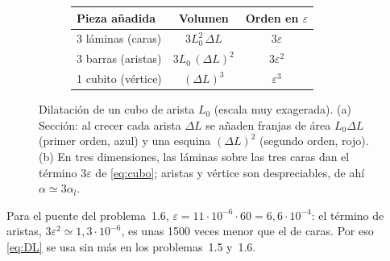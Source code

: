 \begin{figure}[htbp]
\centering
\begin{subfigure}[c]{0.4\textwidth}\centering
{}
\caption{}
\end{subfigure}\hfill
\begin{subfigure}[c]{0.52\textwidth}\centering
\small
\begin{tabular}{lcc}
\toprule
Pieza añadida & Volumen & Orden en $\varepsilon$\\
\midrule
3 láminas (caras) & $3L_0^2\,\Delta L$ & $3\varepsilon$\\
3 barras (aristas) & $3L_0\,(\Delta L)^2$ & $3\varepsilon^2$\\
1 cubito (vértice) & $(\Delta L)^3$ & $\varepsilon^3$\\
\bottomrule
\end{tabular}
\vspace{1.2cm}
\caption{}
\end{subfigure}
\caption{Dilatación de un cubo de arista $L_0$ (escala muy exagerada). (a) Sección: al crecer cada arista
$\Delta L$ se añaden franjas de área $L_0\Delta L$ (primer orden, azul) y una esquina $(\Delta L)^2$
(segundo orden, rojo). (b) En tres dimensiones, las láminas sobre las tres caras dan el término
$3\varepsilon$ de \eqref{eq:cubo}; aristas y vértice son despreciables, de ahí $\alpha\simeq3\alpha_l$.}
\label{fig:cubo}
\end{figure}

\begin{observacion}
Para el puente del problema~1.6, $\varepsilon=11\cdot10^{-6}\cdot60=6{,}6\cdot10^{-4}$: el término de
aristas, $3\varepsilon^2\simeq1{,}3\cdot10^{-6}$, es unas 1500 veces menor que el de caras. Por eso
\eqref{eq:DL} se usa sin más en los problemas~1.5 y~1.6.
\end{observacion}


